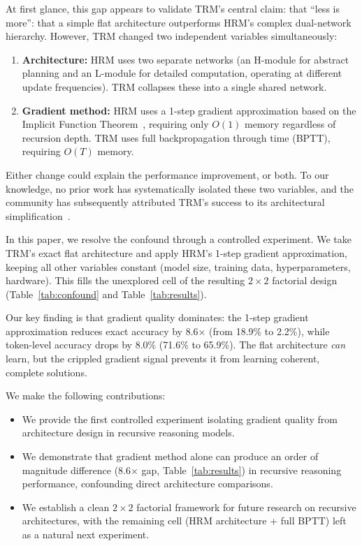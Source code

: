 \documentclass{article}
\begin{document}
At first glance, this gap appears to validate TRM's central claim: that ``less is more'': that a simple flat architecture outperforms HRM's complex dual-network hierarchy. However, TRM changed two independent variables simultaneously:
\begin{enumerate}
    \item \textbf{Architecture:} HRM uses two separate networks (an H-module for abstract planning and an L-module for detailed computation, operating at different update frequencies). TRM collapses these into a single shared network.
    \item \textbf{Gradient method:} HRM uses a 1-step gradient approximation based on the Implicit Function Theorem~\cite{bai2019deq}, requiring only $O(1)$ memory regardless of recursion depth. TRM uses full backpropagation through time (BPTT), requiring $O(T)$ memory.
\end{enumerate}

Either change could explain the performance improvement, or both. To our knowledge, no prior work has systematically isolated these two variables, and the community has subsequently attributed TRM's success to its architectural simplification~\cite{arcprize2025}.

In this paper, we resolve the confound through a controlled experiment. We take TRM's exact flat architecture and apply HRM's 1-step gradient approximation, keeping all other variables constant (model size, training data, hyperparameters, hardware). This fills the unexplored cell of the resulting $2\times2$ factorial design (Table~\ref{tab:confound} and Table~\ref{tab:results}).

Our key finding is that gradient quality dominates: the 1-step gradient approximation reduces exact accuracy by 8.6$\times$ (from 18.9\% to 2.2\%), while token-level accuracy drops by 8.0\% (71.6\% to 65.9\%). The flat architecture \emph{can} learn, but the crippled gradient signal prevents it from learning coherent, complete solutions.

We make the following contributions:
\begin{itemize}
    \item We provide the first controlled experiment isolating gradient quality from architecture design in recursive reasoning models.
    \item We demonstrate that gradient method alone can produce an order of magnitude difference (8.6$\times$ gap, Table~\ref{tab:results}) in recursive reasoning performance, confounding direct architecture comparisons.
    \item We establish a clean $2\times2$ factorial framework for future research on recursive architectures, with the remaining cell (HRM architecture + full BPTT) left as a natural next experiment.
\end{itemize}
\end{document}

